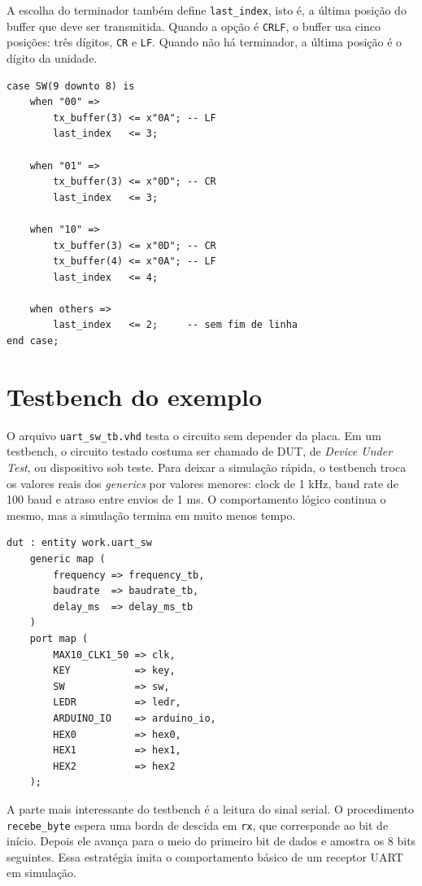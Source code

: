 \documentclass[12pt,a4paper]{book}
\begin{document}
A escolha do terminador também define \texttt{last\_index}, isto é, a última posição do buffer que deve ser transmitida. Quando a opção é \texttt{CRLF}, o buffer usa cinco posições: três dígitos, \texttt{CR} e \texttt{LF}. Quando não há terminador, a última posição é o dígito da unidade.

\begin{lstlisting}[caption={Escolha do terminador e da última posição do buffer.}]
case SW(9 downto 8) is
    when "00" =>
        tx_buffer(3) <= x"0A"; -- LF
        last_index   <= 3;

    when "01" =>
        tx_buffer(3) <= x"0D"; -- CR
        last_index   <= 3;

    when "10" =>
        tx_buffer(3) <= x"0D"; -- CR
        tx_buffer(4) <= x"0A"; -- LF
        last_index   <= 4;

    when others =>
        last_index   <= 2;     -- sem fim de linha
end case;
\end{lstlisting}

\section{Testbench do exemplo}

O arquivo \texttt{uart\_sw\_tb.vhd} testa o circuito sem depender da placa. Em um testbench, o circuito testado costuma ser chamado de DUT, de \textit{Device Under Test}, ou dispositivo sob teste. Para deixar a simulação rápida, o testbench troca os valores reais dos \textit{generics} por valores menores: clock de 1 kHz, baud rate de 100 baud e atraso entre envios de 1 ms. O comportamento lógico continua o mesmo, mas a simulação termina em muito menos tempo.

\begin{lstlisting}[caption={Instanciação do DUT com parâmetros reduzidos para simulação.}]
dut : entity work.uart_sw
    generic map (
        frequency => frequency_tb,
        baudrate  => baudrate_tb,
        delay_ms  => delay_ms_tb
    )
    port map (
        MAX10_CLK1_50 => clk,
        KEY           => key,
        SW            => sw,
        LEDR          => ledr,
        ARDUINO_IO    => arduino_io,
        HEX0          => hex0,
        HEX1          => hex1,
        HEX2          => hex2
    );
\end{lstlisting}

A parte mais interessante do testbench é a leitura do sinal serial. O procedimento \texttt{recebe\_byte} espera uma borda de descida em \texttt{rx}, que corresponde ao bit de início. Depois ele avança para o meio do primeiro bit de dados e amostra os 8 bits seguintes. Essa estratégia imita o comportamento básico de um receptor UART em simulação.
\end{document}

